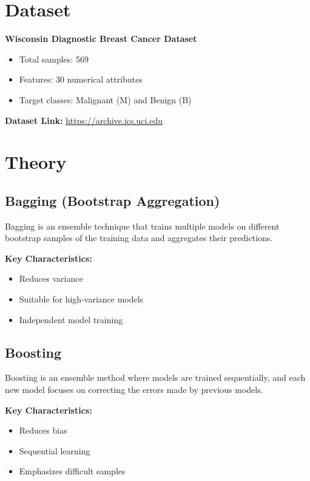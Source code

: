 \documentclass[11pt]{article}
\begin{document}

\section*{Dataset}
\textbf{Wisconsin Diagnostic Breast Cancer Dataset}

\begin{itemize}
    \item Total samples: 569
    \item Features: 30 numerical attributes
    \item Target classes: Malignant (M) and Benign (B)
\end{itemize}

\textbf{Dataset Link:}  
\href{https://archive.ics.uci.edu/dataset/17/breast+cancer+wisconsin+diagnostic}{https://archive.ics.uci.edu}


\section*{Theory}

\subsection*{Bagging (Bootstrap Aggregation)}
Bagging is an ensemble technique that trains multiple models on different bootstrap samples of the training data and aggregates their predictions.

\textbf{Key Characteristics:}
\begin{itemize}
    \item Reduces variance
    \item Suitable for high-variance models
    \item Independent model training
\end{itemize}

\subsection*{Boosting}
Boosting is an ensemble method where models are trained sequentially, and each new model focuses on correcting the errors made by previous models.

\textbf{Key Characteristics:}
\begin{itemize}
    \item Reduces bias
    \item Sequential learning
    \item Emphasizes difficult samples
\end{itemize}
\end{document}
